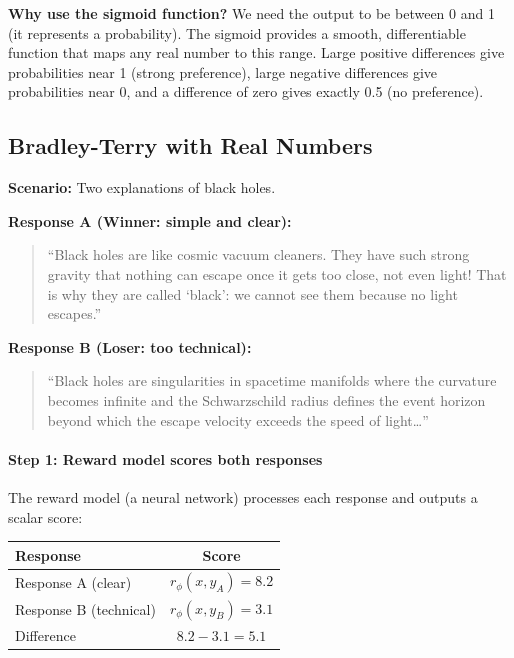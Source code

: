 \begin{chapterenv}
\begin{infobox}
\textbf{Why use the sigmoid function?} We need the output to be between 0 and 1 (it represents a probability). The sigmoid provides a smooth, differentiable function that maps any real number to this range. Large positive differences give probabilities near 1 (strong preference), large negative differences give probabilities near 0, and a difference of zero gives exactly 0.5 (no preference).
\end{infobox}

\subsection{Bradley-Terry with Real Numbers}

\textbf{Scenario:} Two explanations of black holes.

\textbf{Response A (Winner: simple and clear):}
\begin{quote}
``Black holes are like cosmic vacuum cleaners. They have such strong gravity that nothing can escape once it gets too close, not even light! That is why they are called `black': we cannot see them because no light escapes.''
\end{quote}

\textbf{Response B (Loser: too technical):}
\begin{quote}
``Black holes are singularities in spacetime manifolds where the curvature becomes infinite and the Schwarzschild radius defines the event horizon beyond which the escape velocity exceeds the speed of light\ldots''
\end{quote}

\paragraph{Step 1: Reward model scores both responses}

The reward model (a neural network) processes each response and outputs a scalar score:

\begin{center}
\begin{tabular}{lc}
\toprule
\textbf{Response} & \textbf{Score} \\
\midrule
Response A (clear) & $r_\phi(x, y_A) = 8.2$ \\
Response B (technical) & $r_\phi(x, y_B) = 3.1$ \\
\midrule
Difference & $8.2 - 3.1 = 5.1$ \\
\bottomrule
\end{tabular}
\end{center}


\end{chapterenv}
